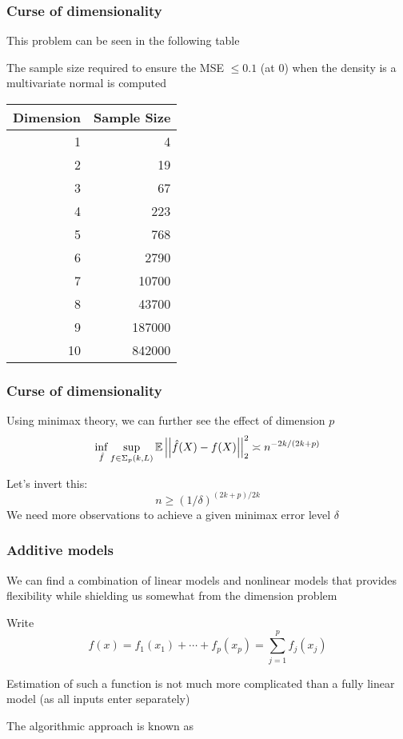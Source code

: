 \documentclass[12pt]{beamer}
\begin{document}
\begin{frame}[fragile]
\frametitle{Curse of dimensionality}
This problem can be seen in the following table 

\vsp
The sample size required to ensure the MSE $\leq 0.1$ (at 0)
when the density is a multivariate normal is computed


\vsp
\begin{tabular}{rr}
Dimension & Sample Size \\
\hline
1 & 4 \\
2 & 19 \\
3 & 67 \\
4 & 223 \\
5 & 768 \\
6 & 2790 \\
7 & 10700 \\
8 & 43700 \\
9 & 187000 \\
10 & 842000
\end{tabular}
\end{frame}

\begin{frame}[fragile]
\frametitle{Curse of dimensionality}
Using minimax theory, we can further see the effect of dimension $p$
\[
\inf_{\hat{f}} \sup_{f \in \Sigma_p(k,L)}\mathbb{E} \left|\left| \hat{f}(X) - f(X) \right|\right|_2^2 \asymp n^{-2k/(2k+p)}
\]

\vsp
Let's invert this:
\[
n \geq (1/\delta)^{(2k + p)/2k}
\]
We need  more observations to achieve a given minimax error level $\delta$ 
\end{frame}

\begin{frame}[fragile]
\frametitle{Additive models}
We can find a combination of linear models and nonlinear models that provides flexibility
while shielding us somewhat from the dimension problem

\vsp
Write
\[
f(x) = f_1(x_1) + \cdots + f_p(x_p) = \sum_{j=1}^p f_j(x_j)
\]

\vsp
Estimation of such a function is not much more complicated than a fully linear model (as all inputs enter
separately)

\vsp
The algorithmic approach is known as 

\end{frame}
\end{document}
